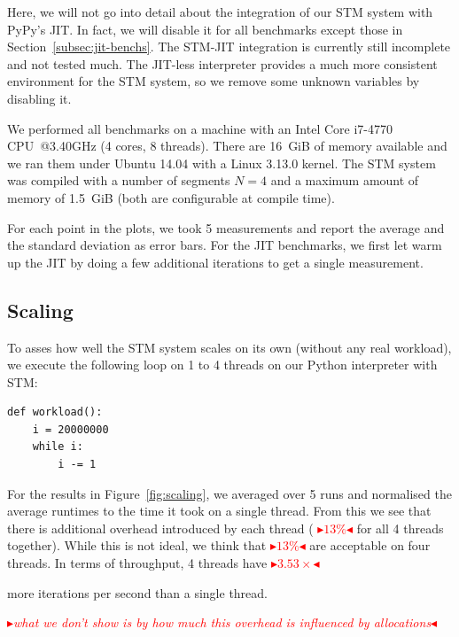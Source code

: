 \documentclass{sigplanconf}
\newcommand{\mynote}[2]{%
  \textcolor{red}{%
    \fbox{\bfseries\sffamily\scriptsize#1}%
    {\small$\blacktriangleright$\textsf{\emph{#2}}$\blacktriangleleft$}%
  }%
}
\newcommand\remi[1]{\mynote{Remi}{#1}}
\begin{document}
Here, we will not go into detail about the integration of our STM
system with PyPy's JIT. In fact, we will disable it for all benchmarks
except those in Section~\ref{subsec:jit-benchs}. The STM-JIT
integration is currently still incomplete and not tested much. The
JIT-less interpreter provides a much more consistent environment for
the STM system, so we remove some unknown variables by disabling it.


We performed all benchmarks on a machine with an Intel Core i7-4770
CPU~@3.40GHz (4 cores, 8 threads).  There are 16~GiB of memory
available and we ran them under Ubuntu 14.04 with a Linux 3.13.0
kernel. The STM system was compiled with a number of segments $N=4$
and a maximum amount of memory of 1.5~GiB (both are configurable at
compile time).

For each point in the plots, we took 5 measurements and report the
average and the standard deviation as error bars. For the JIT
benchmarks, we first let warm up the JIT by doing a few
additional iterations to get a single measurement.



\subsection{Scaling}

To asses how well the STM system scales on its own (without any real
workload), we execute the following loop on 1 to 4 threads on our
Python interpreter with STM:
\begin{lstlisting}
def workload():
    i = 20000000
    while i:
        i -= 1
\end{lstlisting}

For the results in Figure~\ref{fig:scaling}, we averaged over 5 runs
and normalised the average runtimes to the time it took on a single
thread. From this we see that there is additional overhead introduced
by each thread (\remi{$13\%$} for all 4 threads together). While this
is not ideal, we think that \remi{$13\%$} are acceptable on four
threads. In terms of throughput, 4 threads have \remi{$3.53\times$}
more iterations per second than a single thread.

\remi{what we don't show is by how much this overhead is influenced
by allocations}
\end{document}
